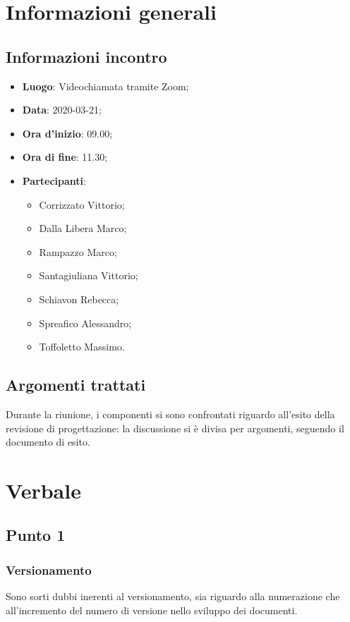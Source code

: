 \section{Informazioni generali}
    \subsection{Informazioni incontro}
        \begin{itemize}
            \item \textbf{Luogo}: Videochiamata tramite Zoom;
            \item \textbf{Data}: 2020-03-21;
            \item \textbf{Ora d'inizio}: 09.00;
            \item \textbf{Ora di fine}: 11.30;
            \item \textbf{Partecipanti}: \begin{itemize}
                \item Corrizzato Vittorio;
                \item Dalla Libera Marco;
                \item Rampazzo Marco;
                \item Santagiuliana Vittorio;
                \item Schiavon Rebecca;
                \item Spreafico Alessandro;
                \item Toffoletto Massimo.
            \end{itemize}
        \end{itemize}
    \subsection{Argomenti trattati}
        Durante la riunione, i componenti si sono confrontati riguardo all'esito della revisione di progettazione: la discussione si è divisa per argomenti, seguendo il documento di esito.
\section{Verbale}
    \subsection{Punto 1}
        \subsubsection{Versionamento}
            Sono sorti dubbi inerenti al versionamento, sia riguardo alla numerazione che all'incremento del numero di versione nello sviluppo dei documenti.
